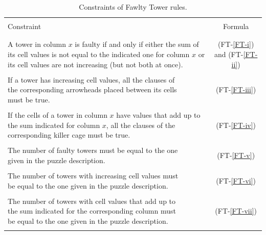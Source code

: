 \begin{table}[hb!]
    \centering
    \begin{tabular*}{\textwidth}{l @{\extracolsep{\fill}} c}
        \hline
        \\
        Constraint &Formula\\
        \\
        \hline
        \\
        \makecell[cl]{A tower in column $x$ is faulty if and only if either the\\
        sum of its cell values is not equal to the indicated one\\
        for column $x$ or its cell values are not increasing (but\\
        not both at once).} & (FT-\ref{FT-i}) and (FT-\ref{FT-ii})\\
        \\
        \makecell[cl]{If a tower has increasing cell values, all the clauses of\\
        the corresponding arrowheads placed between its cells\\
        must be true.} & (FT-\ref{FT-iii})\\
        \\
        \makecell[cl]{If the cells of a tower in column $x$ have values that add\\
        up to the sum indicated for column $x$, all the\\
        clauses of the corresponding killer cage must be true.} & (FT-\ref{FT-iv})\\
        \\
        \makecell[cl]{The number of faulty towers must be equal to the one\\
        given in the puzzle description.} & (FT-\ref{FT-v})\\
        \\
        \makecell[cl]{The number of towers with increasing cell values must\\
        be equal to the one given in the puzzle description.} & (FT-\ref{FT-vi})\\
        \\
        \makecell[cl]{The number of towers with cell values that add up to\\
        the sum indicated for the corresponding column must\\
        be equal to the one given in the puzzle description.} & (FT-\ref{FT-vii})\\
        \\
        \hline
    \end{tabular*}
        \caption{Constraints of Fawlty Tower rules.}
    \label{Constraints:FawltyTowers}
\end{table}

